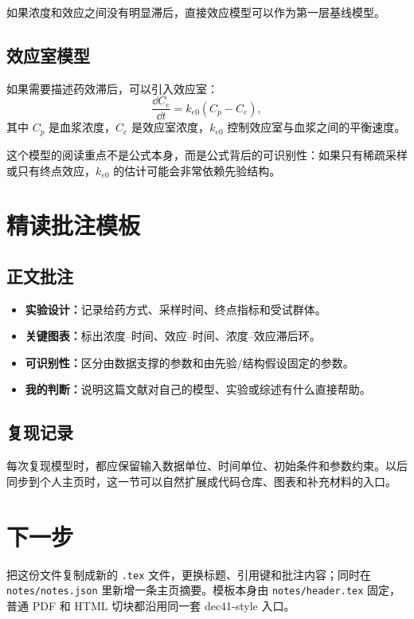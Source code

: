\documentclass[a4paper]{article}
\begin{document}
\begin{assumption}
  如果浓度和效应之间没有明显滞后，直接效应模型可以作为第一层基线模型。
\end{assumption}

\subsection{效应室模型}

如果需要描述药效滞后，可以引入效应室：
\[
  \frac{\dd C_e}{\dd t} = k_{e0}(C_p - C_e),
\]
其中 $C_p$ 是血浆浓度，$C_e$ 是效应室浓度，$k_{e0}$ 控制效应室与血浆之间的平衡速度。

这个模型的阅读重点不是公式本身，而是公式背后的可识别性：如果只有稀疏采样或只有终点效应，$k_{e0}$ 的估计可能会非常依赖先验结构。

\section{精读批注模板}

\subsection{正文批注}

\begin{itemize}[leftmargin=2em]
  \item \textbf{实验设计：}记录给药方式、采样时间、终点指标和受试群体。
  \item \textbf{关键图表：}标出浓度--时间、效应--时间、浓度--效应滞后环。
  \item \textbf{可识别性：}区分由数据支撑的参数和由先验/结构假设固定的参数。
  \item \textbf{我的判断：}说明这篇文献对自己的模型、实验或综述有什么直接帮助。
\end{itemize}

\subsection{复现记录}

每次复现模型时，都应保留输入数据单位、时间单位、初始条件和参数约束。以后同步到个人主页时，这一节可以自然扩展成代码仓库、图表和补充材料的入口。

\section{下一步}

把这份文件复制成新的 \texttt{.tex} 文件，更换标题、引用键和批注内容；同时在 \texttt{notes/notes.json} 里新增一条主页摘要。模板本身由 \texttt{notes/header.tex} 固定，普通 PDF 和 HTML 切块都沿用同一套 dec41-style 入口。



\end{document}
